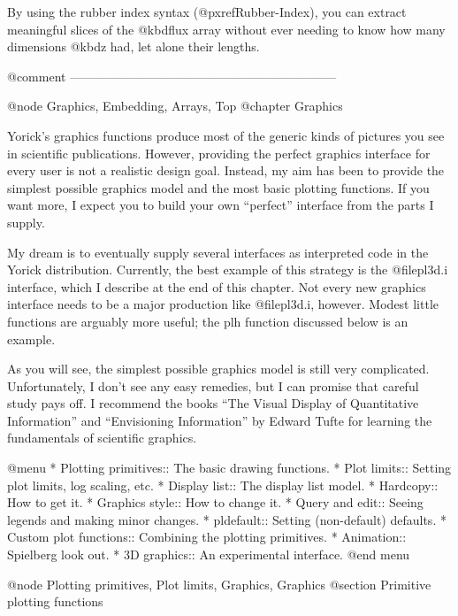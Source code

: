 By using the rubber index syntax (@pxref{Rubber-Index}), you can extract
meaningful slices of the @kbd{flux} array without ever needing to know
how many dimensions @kbd{z} had, let alone their lengths.




@comment -----------------------------------------------------------------

@node Graphics, Embedding, Arrays, Top
@chapter Graphics

Yorick's graphics functions produce most of the generic kinds of
pictures you see in scientific publications.  However, providing the
perfect graphics interface for every user is not a realistic design
goal.  Instead, my aim has been to provide the simplest possible
graphics model and the most basic plotting functions.  If you want more,
I expect you to build your own ``perfect'' interface from the parts I
supply.

My dream is to eventually supply several interfaces as interpreted code
in the Yorick distribution.  Currently, the best example of this
strategy is the @file{pl3d.i} interface, which I describe at the end of
this chapter.  Not every new graphics interface needs to be a major
production like @file{pl3d.i}, however.  Modest little functions are
arguably more useful; the plh function discussed below is an
example.

As you will see, the simplest possible graphics model is still very
complicated.  Unfortunately, I don't see any easy remedies, but I can
promise that careful study pays off.  I recommend the books ``The Visual
Display of Quantitative Information'' and ``Envisioning Information'' by
Edward Tufte for learning the fundamentals of scientific graphics.

@menu
* Plotting primitives::         The basic drawing functions.
* Plot limits::                 Setting plot limits, log scaling, etc.
* Display list::                The display list model.
* Hardcopy::                    How to get it.
* Graphics style::              How to change it.
* Query and edit::              Seeing legends and making minor changes.
* pldefault::                   Setting (non-default) defaults.
* Custom plot functions::       Combining the plotting primitives.
* Animation::                   Spielberg look out.
* 3D graphics::                 An experimental interface.
@end menu

@node Plotting primitives, Plot limits, Graphics, Graphics
@section Primitive plotting functions

